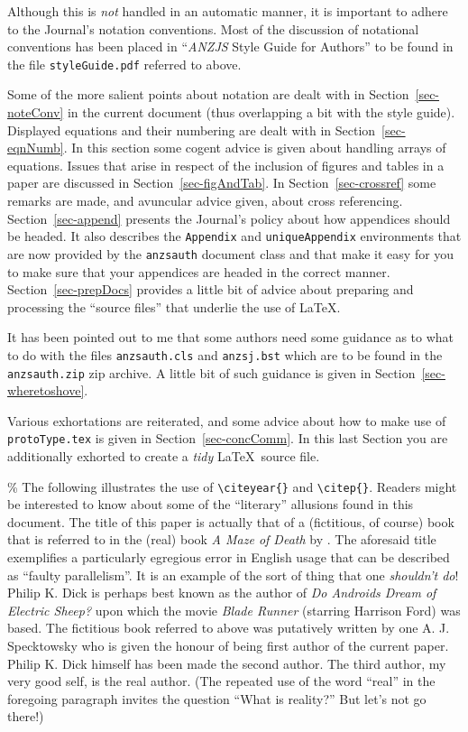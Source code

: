 \documentclass[
  times,
  doublespace]{anzsauth}
\begin{document}
Although this is \emph{not} handled in an automatic manner, it is
important to adhere to the Journal's notation conventions. Most of the
discussion of notational conventions has been placed in ``\emph{ANZJS}
Style Guide for Authors'' to be found in the file
\texttt{styleGuide.pdf} referred to above.

Some of the more salient points about notation are dealt with in
Section~\ref{sec-noteConv} in the current document (thus overlapping a
bit with the style guide). Displayed equations and their numbering are
dealt with in Section~\ref{sec-eqnNumb}. In this section some cogent
advice is given about handling arrays of equations. Issues that arise in
respect of the inclusion of figures and tables in a paper are discussed
in Section~\ref{sec-figAndTab}. In Section~\ref{sec-crossref} some
remarks are made, and avuncular advice given, about cross referencing.
Section~\ref{sec-append} presents the Journal's policy about how
appendices should be headed. It also describes the \texttt{Appendix} and
\texttt{uniqueAppendix} environments that are now provided by the
\texttt{anzsauth} document class and that make it easy for you to make
sure that your appendices are headed in the correct manner.
Section~\ref{sec-prepDocs} provides a little bit of advice about
preparing and processing the ``source files'' that underlie the use of
\LaTeX.

It has been pointed out to me that some authors need some guidance as to
what to do with the files \texttt{anzsauth.cls} and \texttt{anzsj.bst}
which are to be found in the \texttt{anzsauth.zip} zip archive. A little
bit of such guidance is given in Section~\ref{sec-wheretoshove}.

Various exhortations are reiterated, and some advice about how to make
use of \texttt{protoType.tex} is given in Section~\ref{sec-concComm}. In
this last Section you are additionally exhorted to create a \emph{tidy}
\LaTeX~source file.

\% The following illustrates the use of
\texttt{\textbackslash{}citeyear\{\}} and
\texttt{\textbackslash{}citep\{\}}. Readers might be interested to know
about some of the ``literary'' allusions found in this document. The
title of this paper is actually that of a (fictitious, of course) book
that is referred to in the (real) book \emph{A Maze of Death} by
\citet{Dick1971}. The aforesaid title exemplifies a particularly
egregious error in English usage that can be described as ``faulty
parallelism''. It is an example of the sort of thing that one
\emph{shouldn't do}! Philip K. Dick is perhaps best known as the author
of \emph{Do Androids Dream of Electric Sheep?} \citep{Dick1968} upon
which the movie \emph{Blade Runner} (starring Harrison Ford) was based.
The fictitious book referred to above was putatively written by one A.
J. Specktowsky who is given the honour of being first author of the
current paper. Philip K. Dick himself has been made the second author.
The third author, my very good self, is the real author. (The repeated
use of the word ``real'' in the foregoing paragraph invites the question
``What is reality?'' But let's not go there!)
\end{document}
